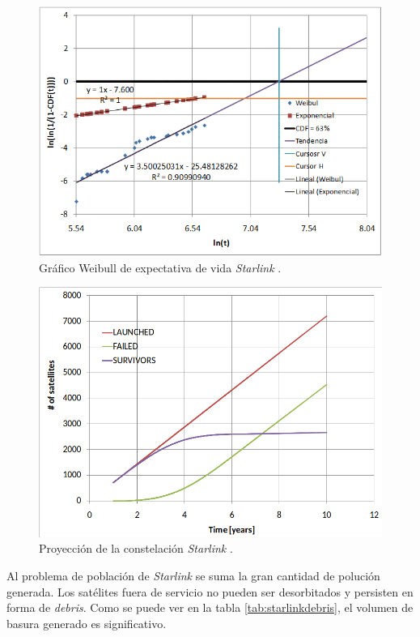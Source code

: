 \begin{figure}[htbp]
	\centering
	\includegraphics[width=\textwidth]{./Figures/starlinkdeath.png}
    \caption{Gráfico Weibull de expectativa de vida \emph{Starlink} \citep{ARTICLE:cibils}.}
	\label{fig:starlinkdeath1}
\end{figure}

\begin{figure}[htbp]
	\centering
	\includegraphics[width=\textwidth]{./Figures/starlinkpopulation.png}
    \caption{Proyección de la constelación \emph{Starlink} \citep{ARTICLE:cibils}.}
	\label{fig:starlinkdeath2}
\end{figure}

Al problema de población de \emph{Starlink} se suma la gran cantidad de polución generada.
Los satélites fuera de servicio no pueden ser desorbitados y persisten en forma de \emph{debris}.
Como se puede ver en la tabla \ref{tab:starlinkdebris}, el volumen de basura generado es significativo.


